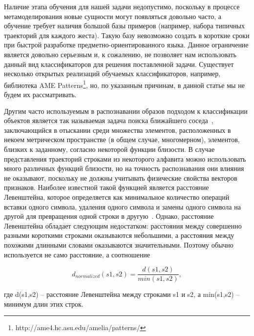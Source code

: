 \documentclass[a5paper]{article}
\begin{document}
Наличие этапа обучения для нашей задачи недопустимо, поскольку в процессе метамоделирования новые сущности могут появляться довольно часто, а обучение требует наличия большой базы примеров (например, набора типичных траекторий для каждого жеста). Такую базу невозможно создать в короткие сроки при быстрой разработке предметно-ориентированного языка. Данное ограничение является довольно серьезным и, к сожалению, не позволяет нам использовать данный вид классификаторов для решения поставленной задачи. Существует несколько открытых реализаций обучаемых классификаторов, например, библиотека AME Patterns\footnote{http://ame4.hc.asu.edu/amelia/patterns/}, но, по указанным причинам, в данной статье мы не будем их рассматривать.

Другим часто используемым в распознавании образов подходом к классификации объектов является так называемая задача поиска ближайшего соседа~\cite{nns1, nns2}, заключающийся в отыскании среди множества элементов, расположенных в некоем метрическом пространстве (в общем случае, многомерном), элементов, близких к заданному, согласно некоторой функции близости. В случае представления траекторий строками из некоторого алфавита можно использовать много различных функций близости, но на точность распознавания они влияния не оказывают, поскольку не должны учитывать физические свойства векторов признаков. Наиболее известной такой функцией является расстояние Левенштейна, которое определяется как минимальное количество операций вставки одного символа, удаления одного символа и замены одного символа на другой для превращения одной строки в другую~\cite{levenshtein}. Однако, расстояние Левенштейна обладает следующим недостатком: расстояния между совершенно разными короткими строками оказываются небольшими, а расстояния между похожими длинными словами оказываются значительными. Поэтому обычно используется не само расстояние, а соотношение 

\begin{equation}
\label{levenshtein}
d_{normalized}(s1,s2) = \frac{d(s1,s2)}{min(s1,s2)},
\end{equation}

где d(s1,s2) -- расстояние Левенштейна между строками s1 и s2, а min(s1,s2) -- минимум длин этих строк.
\end{document}
